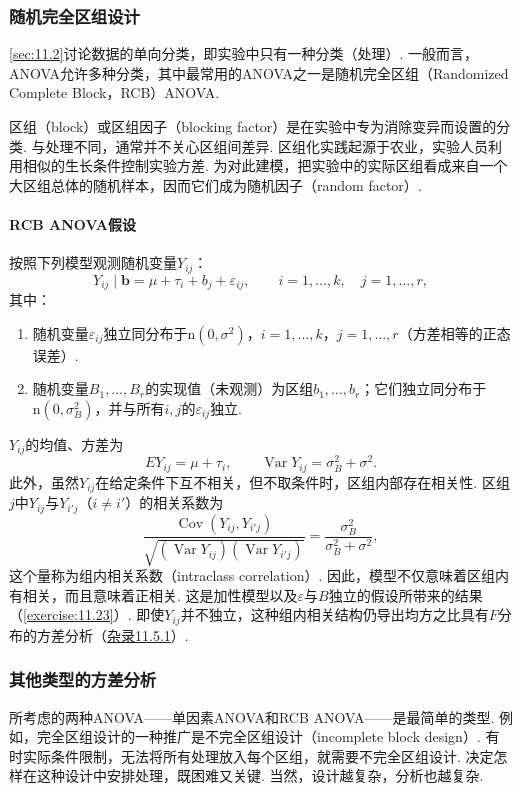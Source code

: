\subsubsection{随机完全区组设计}\label{sec:11.5.3}
\autoref{sec:11.2}讨论数据的单向分类，即实验中只有一种分类（处理）. 一般而言，ANOVA允许多种分类，其中最常用的ANOVA之一是随机完全区组（Randomized Complete Block，RCB）ANOVA.

区组（block）或区组因子（blocking factor）是在实验中专为消除变异而设置的分类. 与处理不同，通常并不关心区组间差异. 区组化实践起源于农业，实验人员利用相似的生长条件控制实验方差. 为对此建模，把实验中的实际区组看成来自一个大区组总体的随机样本，因而它们成为随机因子（random factor）.

\paragraph{RCB ANOVA假设}
按照下列模型观测随机变量$Y_{ij}$：
$$Y_{ij}\mid\boldsymbol b=\mu+\tau_i+b_j+\varepsilon_{ij},\qquad i=1,\ldots,k,\quad j=1,\ldots,r,$$
其中：
\begin{enumerate}[label=(\roman*)]
\item\label{item:11.5.3.i} 随机变量$\varepsilon_{ij}$独立同分布于$\mathrm n(0,\sigma^2)$，$i=1,\ldots,k$，$j=1,\ldots,r$（方差相等的正态误差）.
\item\label{item:11.5.3.ii} 随机变量$B_1,\ldots,B_r$的实现值（未观测）为区组$b_1,\ldots,b_r$；它们独立同分布于$\mathrm n(0,\sigma_B^2)$，并与所有$i,j$的$\varepsilon_{ij}$独立.
\end{enumerate}
$Y_{ij}$的均值、方差为
$$EY_{ij}=\mu+\tau_i,\qquad\operatorname{Var}Y_{ij}=\sigma_B^2+\sigma^2.$$
此外，虽然$Y_{ij}$在给定条件下互不相关，但不取条件时，区组内部存在相关性. 区组$j$中$Y_{ij}$与$Y_{i'j}$（$i\ne i'$）的相关系数为
$$\frac{\operatorname{Cov}(Y_{ij},Y_{i'j})}{\sqrt{(\operatorname{Var}Y_{ij})(\operatorname{Var}Y_{i'j})}}
=\frac{\sigma_B^2}{\sigma_B^2+\sigma^2},$$
这个量称为组内相关系数（intraclass correlation）. 因此，模型不仅意味着区组内有相关，而且意味着正相关. 这是加性模型以及$\varepsilon$与$B$独立的假设所带来的结果（\autoref{exercise:11.23}\mbox{）.} 即使$Y_{ij}$并不独立，这种组内相关结构仍导出均方之比具有$F$分布的方差分析（\hyperref[sec:11.5.1]{杂录11.5.1}）.

\subsubsection{其他类型的方差分析}\label{sec:11.5.4}
所考虑的两种ANOVA——单因素ANOVA和RCB ANOVA——是最简单的类型. 例如，完全区组设计的一种推广是不完全区组设计（incomplete block design）. 有时实际条件限制，无法将所有处理放入每个区组，就需要不完全区组设计. 决定怎样在这种设计中安排处理，既困难又关键. 当然，设计越复杂，分析也越复杂.

